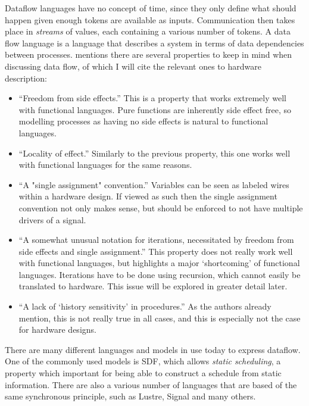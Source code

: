 Dataflow languages have no concept of time, since they only define what should happen given enough tokens are available as inputs.
Communication then takes place in \textit{streams} of values, each containing a various number of tokens.
A data flow language is a language that describes a system in terms of data dependencies between processes. 
\cite{ackerman1982data} mentions there are several properties to keep in mind when discussing data flow, of which I will cite the relevant ones to hardware description:
\begin{itemize}
 \item 
    ``Freedom from side effects.''
    This is a property that works extremely well with functional languages.
    Pure functions are inherently side effect free, so modelling processes as having no side effects is natural to functional languages.
 \item
    ``Locality of effect.''
    Similarly to the previous property, this one works well with functional languages for the same reasons.
 \item 
    ``A "single assignment" convention.''
    Variables can be seen as labeled wires within a hardware design. 
    If viewed as such then the single assignment convention not only makes sense, but should be enforced to not have multiple drivers of a signal.
 \item 
    ``A somewhat unusual notation for iterations, necessitated by freedom from side effects and single assignment.''
    This property does not really work well with functional languages, but highlights a major `shortcoming' of functional languages. Iterations have to be done using recursion, which cannot easily be translated to hardware. This issue will be explored in greater detail later.
 \item
    ``A lack of `history sensitivity' in procedures.'' 
    As the authors already mention, this is not really true in all cases, and this is especially not the case for hardware designs.
\end{itemize}

There are many different languages and models in use today to express dataflow.
One of the commonly used models is SDF\cite{lee1987synchronous}, which allows \textit{static scheduling}, a property which important for being able to construct a schedule from static information.
There are also a various number of languages that are based of the same synchronous principle, such as Lustre\cite{halbwachs1991synchronous}, Signal\cite{amagbegnon1995implementation} and many others.

